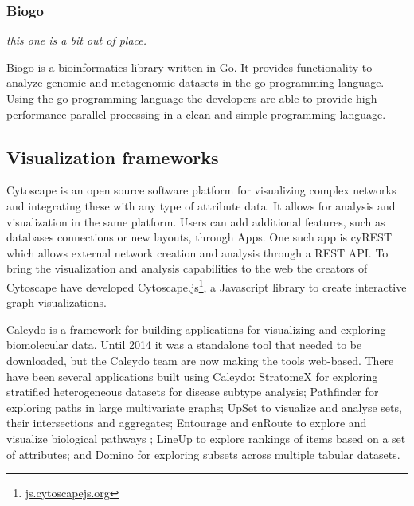 
\subsubsection*{Biogo} 
\emph{this one is a bit out of place.}

Biogo is a bioinformatics library written in Go. It provides functionality to
analyze genomic and metagenomic datasets in the go programming
language.\cite{Kortschak005033} Using the go programming language the developers
are able to provide high-performance parallel processing in a clean and simple
programming language. 

\subsection*{Visualization frameworks} 
Cytoscape is an open source software platform for visualizing complex
networks and integrating these with any type of attribute
data\cite{shannon2003cytoscape}. It allows for analysis and visualization in the
same platform. Users can add additional features, such as databases connections
or new layouts, through Apps. One such app is cyREST which allows external network
creation and analysis through a REST API\cite{ono2015cyrest}.
To bring the visualization and analysis
capabilities to the web the creators of Cytoscape have developed
Cytoscape.js\footnote{\url{js.cytoscapejs.org}}, a Javascript library to create
interactive graph visualizations. 

Caleydo is a framework for building applications for visualizing and exploring
biomolecular data\cite{cleydo}. Until 2014 it was a standalone tool that needed
to be downloaded, but the Caleydo team are now making the tools web-based. There
have been several applications built using Caleydo: StratomeX for exploring
stratified heterogeneous datasets for disease subtype analysis\cite{stratomex};
Pathfinder for exploring paths in large multivariate graphs\cite{pathfinder};
UpSet to visualize and analyse sets, their intersections and
aggregates\cite{upset}; Entourage and enRoute to explore and visualize
biological pathways \cite{entourage}\cite{enroute}; LineUp to explore rankings
of items based on a set of attributes\cite{lineup}; and Domino for exploring
subsets across multiple tabular datasets\cite{domino}. 

